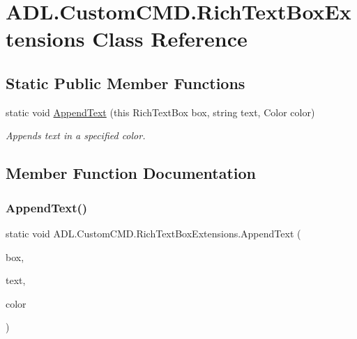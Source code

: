 \hypertarget{class_a_d_l_1_1_custom_c_m_d_1_1_rich_text_box_extensions}{}\section{A\+D\+L.\+Custom\+C\+M\+D.\+Rich\+Text\+Box\+Extensions Class Reference}
\label{class_a_d_l_1_1_custom_c_m_d_1_1_rich_text_box_extensions}
\subsection*{Static Public Member Functions}
\begin{DoxyCompactItemize}
\item 
static void \mbox{\hyperlink{class_a_d_l_1_1_custom_c_m_d_1_1_rich_text_box_extensions_a47d508f47f347c3631bcfeb940b080e3}{Append\+Text}} (this Rich\+Text\+Box box, string text, Color color)
\begin{DoxyCompactList}\small\item\em Appends text in a specified color. \end{DoxyCompactList}\end{DoxyCompactItemize}


\subsection{Member Function Documentation}
\mbox{\label{class_a_d_l_1_1_custom_c_m_d_1_1_rich_text_box_extensions_a47d508f47f347c3631bcfeb940b080e3}} 
\subsubsection{\texorpdfstring{Append\+Text()}{AppendText()}}
{\footnotesize\ttfamily static void A\+D\+L.\+Custom\+C\+M\+D.\+Rich\+Text\+Box\+Extensions.\+Append\+Text (\begin{DoxyParamCaption}\item[{this Rich\+Text\+Box}]{box,  }\item[{string}]{text,  }\item[{Color}]{color }\end{DoxyParamCaption})\hspace{0.3cm}{\ttfamily [static]}}



